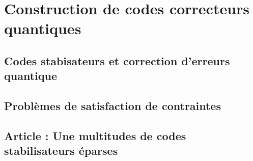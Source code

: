 \begin{comment}
\end{comment}

\chapter{Construction de codes correcteurs quantiques}

\section{Codes stabisateurs et correction d'erreurs quantique}

\section{Problèmes de satisfaction de contraintes}

\section{Article : Une multitudes de codes stabilisateurs éparses}
